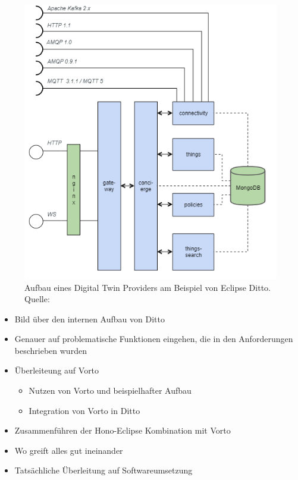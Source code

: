 \begin{figure}
    \centering
    \includegraphics[width=1.0\linewidth]{img/ditto_arch.png}
    \caption[Aufbau eines Digital Twin Providers]{Aufbau eines Digital Twin Providers am Beispiel von Eclipse Ditto.\\Quelle:}
\end{figure}


\begin{itemize}
    \item Bild über den internen Aufbau von Ditto
    \item Genauer auf problematische Funktionen eingehen, die in den Anforderungen beschrieben wurden
    \item Überleiteung auf Vorto
    \begin{itemize}
        \item Nutzen von Vorto und beispielhafter Aufbau
        \item Integration von Vorto in Ditto
    \end{itemize}
    \item Zusammenführen der Hono-Eclipse Kombination mit Vorto
    \item Wo greift alles gut ineinander
    \item Tatsächliche Überleitung auf Softwareumsetzung
\end{itemize}

